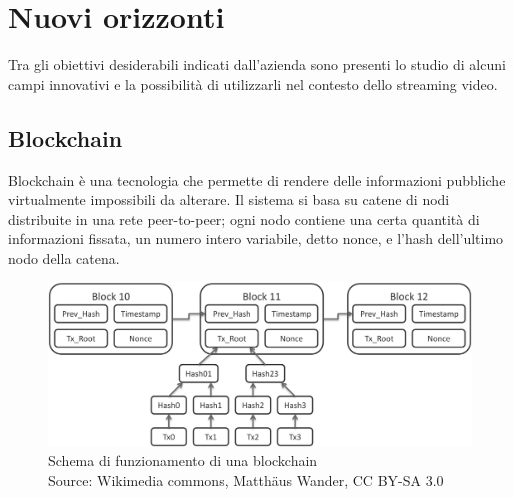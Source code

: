 \section{Nuovi orizzonti}
Tra gli obiettivi desiderabili indicati dall'azienda sono presenti lo studio di alcuni campi innovativi e la possibilità di utilizzarli nel contesto dello streaming video.

	\subsection{Blockchain}
	Blockchain è una tecnologia che permette di rendere delle informazioni pubbliche virtualmente impossibili da alterare. Il sistema si basa su catene di nodi distribuite in una rete peer-to-peer; ogni nodo contiene una certa quantità di informazioni fissata, un numero intero variabile, detto nonce, e l'hash dell'ultimo nodo della catena.
	\begin{figure}[H]
		\begin{center}
			\includegraphics[width=16.5cm,keepaspectratio]{immagini/blockchain-data}
			\caption[Schema di funzionamento di una blockchain]{Schema di funzionamento di una blockchain
			\\
			Source: Wikimedia commons, Matthäus Wander, CC BY-SA 3.0}
		\end{center}
	\end{figure}
